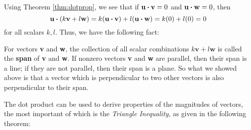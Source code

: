 Using Theorem \ref{thm:dotprop}, we see that if $\textbf{u} \bm{\cdot} \textbf{v} = 0$ and
$\textbf{u} \bm{\cdot} \textbf{w} = 0$, then 
\[\textbf{u} \bm{\cdot} (k\textbf{v} + l\textbf{w}) =
k(\textbf{u} \bm{\cdot} \textbf{v}) + l(\textbf{u} \bm{\cdot} \textbf{w}) = k(0) + l(0) =0\] for all scalars $k, l$.
Thus, we have the following fact:\smallskip
{}

\smallskip
For vectors \textbf{v} and \textbf{w}, the collection of all scalar combinations $k\textbf{v} + l\textbf{w}$
is called the \textbf{span} of \textbf{v} and \textbf{w}. If nonzero vectors \textbf{v} and \textbf{w} are
parallel, then their span is a line; if they are not parallel, then their span is a plane. So what we showed above is
that a vector which is perpendicular to two other vectors is also perpendicular to their span.

The dot product can be used to derive properties of the magnitudes of vectors, the most important of which is the
\emph{Triangle Inequality}, as given in the following theorem:

